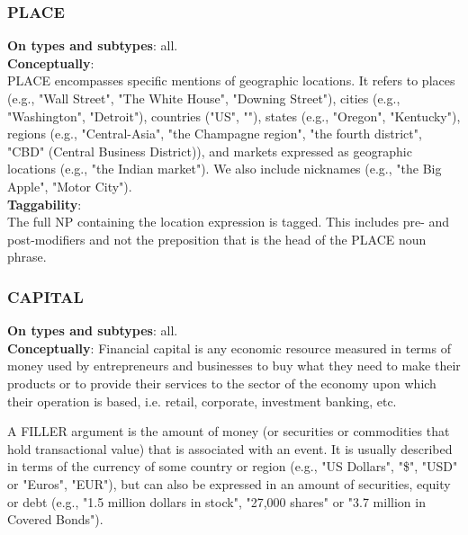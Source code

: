 \vspace{0.5cm}

\hypertarget{PLACE}{
\subsubsection{PLACE}}

\justify
\noindent\textbf{On types and subtypes}: all.\\[6pt]
\noindent\textbf{Conceptually}:\\
PLACE encompasses specific mentions of geographic locations.
It refers to places (e.g., "Wall Street", "The White House", "Downing Street"), cities (e.g., "Washington", "Detroit"), countries ("US", ""), states (e.g., "Oregon", "Kentucky"), regions (e.g., "Central-Asia", "the Champagne region", "the fourth district", "CBD" (Central Business District)), and markets expressed as geographic locations (e.g., "the Indian market"). We also include nicknames (e.g., "the Big Apple", "Motor City").\\

\noindent\textbf{Taggability}:\\
The full NP containing the location expression is tagged.
This includes pre- and post-modifiers and not the preposition that is the head of the PLACE noun phrase.


\vspace{0.5cm}


\hypertarget{CAPITAL}{
\subsubsection{CAPITAL}}

\justify
\noindent\textbf{On types and subtypes}: all.\\[6pt]
\noindent\textbf{Conceptually}:
Financial capital is any economic resource measured in terms of money used by entrepreneurs and businesses to buy what they need to make their products or to provide their services to the sector of the economy upon which their operation is based, i.e. retail, corporate, investment banking, etc.

A  FILLER argument is the amount of money (or securities or commodities that hold transactional value) that is associated with an event. It is usually described in terms of the currency of some country or region (e.g., "US Dollars", "\$", "USD" or "Euros", "EUR"), but can also be expressed in an amount of securities, equity or debt (e.g., "1.5 million dollars in stock", "27,000 shares" or "3.7 million in Covered Bonds").\\

